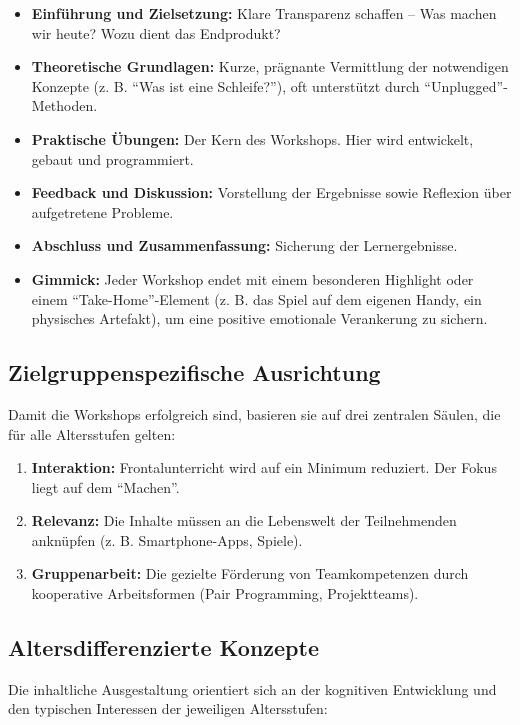\documentclass[a5paper,pagesize,10pt,bibtotoc,pointlessnumbers,
normalheadings,DIV=9,twoside=false]{scrbook}
\begin{document}
\begin{itemize}
    \item \textbf{Einführung und Zielsetzung:} Klare Transparenz schaffen -- Was machen wir heute? Wozu dient das Endprodukt?
    \item \textbf{Theoretische Grundlagen:} Kurze, prägnante Vermittlung der notwendigen Konzepte (z. B. ``Was ist eine Schleife?''), oft unterstützt durch ``Unplugged''-Methoden.
    \item \textbf{Praktische Übungen:} Der Kern des Workshops. Hier wird entwickelt, gebaut und programmiert.
    \item \textbf{Feedback und Diskussion:} Vorstellung der Ergebnisse sowie Reflexion über aufgetretene Probleme.
    \item \textbf{Abschluss und Zusammenfassung:} Sicherung der Lernergebnisse.
    \item \textbf{Gimmick:} Jeder Workshop endet mit einem besonderen Highlight oder einem ``Take-Home''-Element (z. B. das Spiel auf dem eigenen Handy, ein physisches Artefakt), um eine positive emotionale Verankerung zu sichern.
\end{itemize}

\subsection*{Zielgruppenspezifische Ausrichtung}

Damit die Workshops erfolgreich sind, basieren sie auf drei zentralen Säulen, die für alle Altersstufen gelten:

\begin{enumerate}
    \item \textbf{Interaktion:} Frontalunterricht wird auf ein Minimum reduziert. Der Fokus liegt auf dem ``Machen''.
    \item \textbf{Relevanz:} Die Inhalte müssen an die Lebenswelt der Teilnehmenden anknüpfen (z. B. Smartphone-Apps, Spiele).
    \item \textbf{Gruppenarbeit:} Die gezielte Förderung von Teamkompetenzen durch kooperative Arbeitsformen (Pair Programming, Projektteams).
\end{enumerate}

\subsection*{Altersdifferenzierte Konzepte}

Die inhaltliche Ausgestaltung orientiert sich an der kognitiven Entwicklung und den typischen Interessen der jeweiligen Altersstufen:
\end{document}
